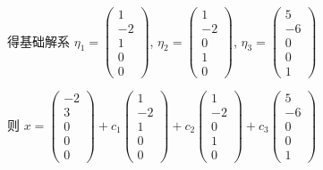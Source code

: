          得基础解系 \( \eta_{1} = \begin{pmatrix}
             1  \\
             -2 \\
             1  \\
             0  \\
             0
         \end{pmatrix} \), \( \eta_{2} = \begin{pmatrix}
             1  \\
             -2 \\
             0  \\
             1  \\
             0
         \end{pmatrix} \), \( \eta_{3} = \begin{pmatrix}
             5  \\
             -6 \\
             0  \\
             0  \\
             1
         \end{pmatrix} \)

         则 \( x = \begin{pmatrix}
             -2 \\
             3  \\
             0  \\
             0  \\
             0
         \end{pmatrix} + c_{1}\begin{pmatrix}
             1  \\
             -2 \\
             1  \\
             0  \\
             0
         \end{pmatrix} + c_{2}\begin{pmatrix}
             1  \\
             -2 \\
             0  \\
             1  \\
             0
         \end{pmatrix} + c_{3}\begin{pmatrix}
             5  \\
             -6 \\
             0  \\
             0  \\
             1
         \end{pmatrix} \)


